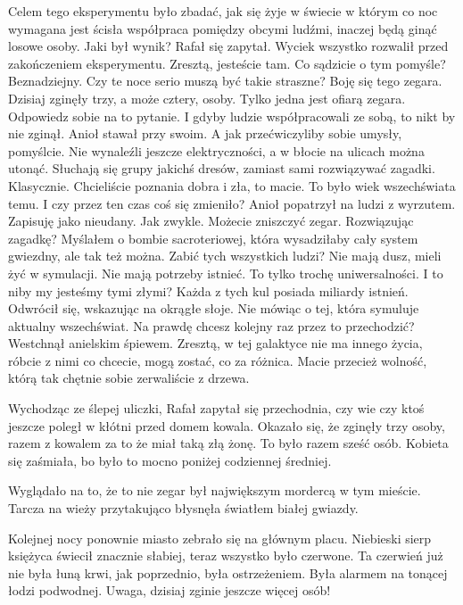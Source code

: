 \begin{dialogue}
	\ds{} Celem tego eksperymentu było zbadać, jak się żyje w świecie w którym co noc wymagana jest ścisła współpraca pomiędzy obcymi ludźmi, inaczej będą ginąć losowe osoby.
	\ds{} Jaki był wynik? \dm{} Rafał się zapytał.
	\ds{} Wyciek wszystko rozwalił przed zakończeniem eksperymentu. Zresztą, jesteście tam. Co sądzicie o tym pomyśle?
	\ds{} Beznadziejny.
	\ds{} Czy te noce serio muszą być takie straszne?
	\ds{} Boję się tego zegara.
	\ds{} Dzisiaj zginęły trzy, a może cztery, osoby. Tylko jedna jest ofiarą zegara. Odpowiedz sobie na to pytanie.
	\ds{} I gdyby ludzie współpracowali ze sobą, to nikt by nie zginął. \dm{} Anioł stawał przy swoim. \dm{} A jak przećwiczyliby sobie umysły, pomyślcie.
	\ds{} Nie wynaleźli jeszcze elektryczności, a w błocie na ulicach można utonąć. Słuchają się grupy jakichś dresów, zamiast sami rozwiązywać zagadki.
	\ds{} Klasycznie. Chcieliście poznania dobra i zła, to macie.
	\ds{} To było wiek wszechświata temu.
	\ds{} I czy przez ten czas coś się zmieniło? \dm{} Anioł popatrzył na ludzi z wyrzutem. \dm{} Zapisuję jako nieudany. Jak zwykle. Możecie zniszczyć zegar.
	\ds{} Rozwiązując zagadkę?
	\ds{} Myślałem o bombie sacroteriowej, która wysadziłaby cały system gwiezdny, ale tak też można.
	\ds{} Zabić tych wszystkich ludzi?
	\ds{} Nie mają dusz, mieli żyć w symulacji. Nie mają potrzeby istnieć. To tylko trochę uniwersalności. 
	\ds{} I to niby my jesteśmy tymi złymi?
	\ds{} Każda z tych kul posiada miliardy istnień. \dm{} Odwrócił się, wskazując na okrągłe słoje. \dm{} Nie mówiąc o tej, która symuluje aktualny wszechświat. Na prawdę chcesz kolejny raz przez to przechodzić?
		\dm{} Westchnął anielskim śpiewem. \dm{} Zresztą, w tej galaktyce nie ma innego życia, róbcie z nimi co chcecie, mogą zostać, co za różnica. 
		Macie przecież wolność, którą tak chętnie sobie zerwaliście z drzewa.
\end{dialogue}

Wychodząc ze ślepej uliczki, Rafał zapytał się przechodnia, czy wie czy ktoś jeszcze poległ w kłótni przed domem kowala. 
Okazało się, że zginęły trzy osoby, razem z kowalem za to że miał taką złą żonę. To było razem sześć osób.
Kobieta się zaśmiała, bo było to mocno poniżej codziennej średniej.

Wyglądało na to, że to nie zegar był największym mordercą w tym mieście.
Tarcza na wieży przytakująco błysnęła światłem białej gwiazdy.

Kolejnej nocy ponownie miasto zebrało się na głównym placu.
Niebieski sierp księżyca świecił znacznie słabiej, teraz wszystko było czerwone.
Ta czerwień już nie była łuną krwi, jak poprzednio, była ostrzeżeniem.
Była alarmem na tonącej łodzi podwodnej.
Uwaga, dzisiaj zginie jeszcze więcej osób!

